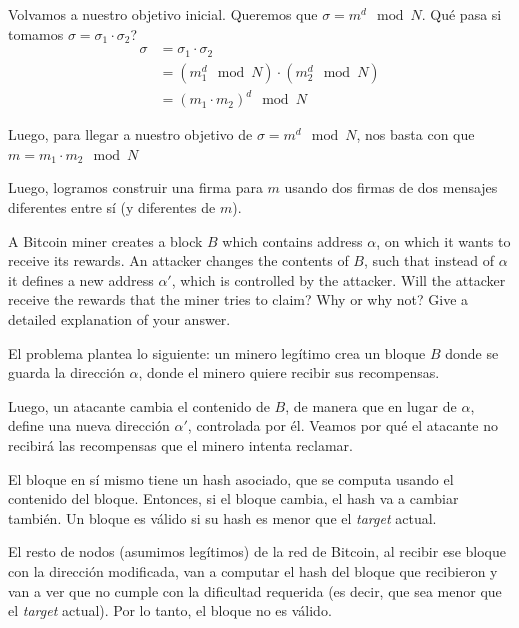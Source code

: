 \documentclass[12pt,addpoints,answers]{exam}
\begin{document}
\begin{questions}
\begin{solution}
    Volvamos a nuestro objetivo inicial. Queremos que $\sigma = m^d \mod N$.
    Qué pasa si tomamos $\sigma = \sigma_1 \cdot \sigma_2$?
    \begin{align*}
        \sigma &= \sigma_1 \cdot \sigma_2 \\
        &= (m_1^d \mod N) \cdot (m_2^d \mod N) \\
        &= (m_1 \cdot m_2)^d \mod N 
    \end{align*}

    Luego, para llegar a nuestro objetivo de $\sigma = m^d \mod N$, 
    nos basta con que $m = m_1 \cdot m_2 \mod N$

    Luego, logramos construir una firma para $m$ usando dos firmas de dos mensajes diferentes 
    entre sí (y diferentes de $m$).
   
\end{solution}

\newpage

\question[10] A Bitcoin miner creates a block $B$ which contains address $\alpha$, on which it wants to receive its rewards. An attacker changes the contents of $B$, such that instead of $\alpha$ it defines a new address $\alpha'$, which is controlled by the attacker. Will the attacker receive the rewards that the miner tries to claim? Why or why not? Give a detailed explanation of your answer.

\begin{solution} %
    El problema plantea lo siguiente: un minero legítimo crea un bloque $B$ donde 
    se guarda la dirección $\alpha$, donde el minero quiere recibir sus recompensas.

    Luego, un atacante cambia el contenido de $B$, de manera que en lugar de $\alpha$, 
    define una nueva dirección $\alpha'$, controlada por él. Veamos por qué 
    el atacante no recibirá las recompensas que el minero intenta reclamar.

    El bloque en sí mismo tiene un hash asociado, que se computa 
    usando el contenido del bloque. Entonces, si el bloque cambia, el hash va a cambiar también.
    Un bloque es válido si su hash es menor que el \textit{target} actual.

    El resto de nodos (asumimos legítimos) de la red de Bitcoin, al recibir ese bloque 
    con la dirección modificada, van a computar el hash del bloque que recibieron y van a ver 
    que no cumple con la dificultad requerida (es decir, que sea menor que el \textit{target} 
    actual). Por lo tanto, el bloque no es válido.


\end{solution}
\end{questions}
\end{document}
